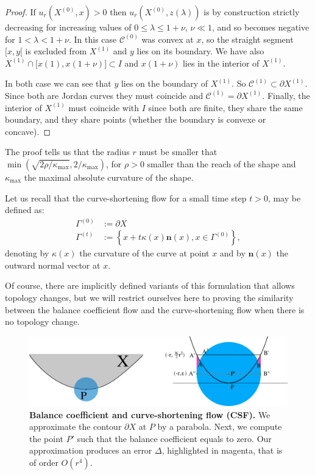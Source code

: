 \documentclass[review]{siamart220329}
\newcommand{\C}{\mathcal{C}} %
\begin{document}
\begin{proof}
  If $u_r(X^{(0)},x)>0$ then $u_r(X^{(0)},z(\lambda))$ is by
  construction strictly decreasing for increasing values of $0 \le
  \lambda \le 1+\nu$, $\nu \ll 1$, and so becomes negative for
  $1<\lambda < 1 + \nu$.  In this case $\C^{(0)}$ was convex at $x$,
  so the straight segment $\lbrack x,y \lbrack$ is excluded from
  $X^{(1)}$ and $y$ lies on its boundary. We have also $X^{(1)}
  \cap \lbrack x(1),x(1+\nu) \rbrack \subset I$ and $x(1+\nu)$ lies in
  the interior of $X^{(1)}$.

  In both case we can see that $y$ lies on the boundary of
  $X^{(1)}$. So $\C^{(1)} \subset \partial X^{(1)}$. Since both
  are Jordan curves they must coincide and $\C^{(1)} = \partial
  X^{(1)}$.  Finally, the interior of $X^{(1)}$ must coincide with
  $I$ since both are finite, they share the same boundary, and they
  share points (whether the boundary is convexe or concave).
\end{proof}

The proof tells us that the radius $r$ must be smaller that
$\min(\sqrt{2\rho / \kappa_{\max}},2 / \kappa_{\max})$, for $\rho>0$
smaller than the reach of the shape and $\kappa_{\max}$ the maximal
absolute curvature of the shape.

Let us recall that the curve-shortening flow for a small time step
$t>0$, may be defined as:
\begin{align}
  \Gamma^{(0)} & := \partial X \nonumber \\
  \Gamma^{(t)} & := \left\{ x + t\kappa(x)\mathbf{n}(x), x \in \Gamma^{(0)} \right\}, \label{eq-csf}
\end{align}
denoting by $\kappa(x)$ the curvature of the curve at point $x$
and by $\mathbf{n}(x)$ the outward normal vector at $x$.

Of course, there are implicitly defined variants of this formulation
that allows topology changes, but we will restrict ourselves here to
proving the similarity between the balance coefficient flow and the
curve-shortening flow when there is no topology change.


%
\begin{figure}
\center
\includegraphics[scale=0.75]{figures/analysis-error/geometry-argument.png}
\caption{\textbf{Balance coefficient and curve-shortening flow (CSF).} We
approximate the contour $\partial X$ at $P$ by a parabola. Next, we compute
the point $P'$ such that the balance coefficient equals to zero. Our
approximation produces an error $\Delta$, highlighted in magenta, that is of
order $O(r^4)$. \label{fig:geometric-argument}}
\end{figure}
%
\end{document}

